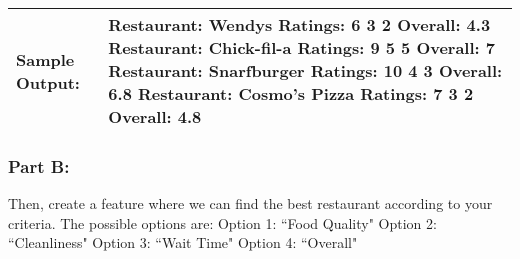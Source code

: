 \begin{longtable}{|p{1.7in}|p{4.3in}|}
\textbf{Sample Output:} &
Restaurant: Wendys Ratings: 6 3 2 Overall: 4.3 \newline
Restaurant: Chick-fil-a Ratings: 9 5 5 Overall: 7 \newline
Restaurant: Snarfburger Ratings: 10 4 3 Overall: 6.8 \newline
Restaurant: Cosmo's Pizza Ratings: 7 3 2 Overall: 4.8
\\ \hline
\end{longtable}

\newpage
\subsubsection{Part B:}
Then, create a feature where we can find the best restaurant according to your criteria. The possible options are: \newline \newline
Option 1: ``Food Quality" \newline
Option 2: ``Cleanliness" \newline
Option 3: ``Wait Time" \newline
Option 4: ``Overall"


